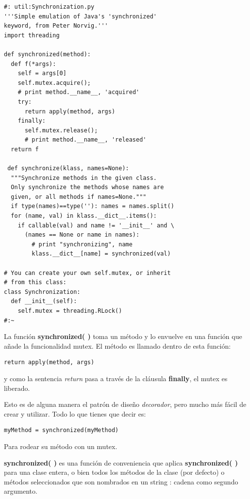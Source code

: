 \documentclass{article}
\begin{document}
\begin{lstlisting}    
#: util:Synchronization.py 
'''Simple emulation of Java's 'synchronized' 
keyword, from Peter Norvig.''' 
import threading 

def synchronized(method): 
  def f(*args): 
    self = args[0] 
    self.mutex.acquire();   
    # print method.__name__, 'acquired' 
    try: 
      return apply(method, args) 
    finally: 
      self.mutex.release();   
      # print method.__name__, 'released' 
  return f 
  
 def synchronize(klass, names=None): 
  """Synchronize methods in the given class.   
  Only synchronize the methods whose names are  
  given, or all methods if names=None.""" 
  if type(names)==type(''): names = names.split() 
  for (name, val) in klass.__dict__.items(): 
    if callable(val) and name != '__init__' and \ 
      (names == None or name in names): 
        # print "synchronizing", name 
        klass.__dict__[name] = synchronized(val) 
        
# You can create your own self.mutex, or inherit 
# from this class: 
class Synchronization: 
  def __init__(self): 
    self.mutex = threading.RLock() 
#:~  
\end{lstlisting}

La función \textbf{synchronized( )} toma un método y lo envuelve en una función que añade la funcionalidad mutex. El método es llamado dentro de esta función:     \newline

\begin{lstlisting} 
return apply(method, args)
\end{lstlisting}

y como la sentencia \textit{return } pasa a través de la cláusula \textbf{finally}, el mutex es liberado. \newline

Esto es de alguna manera el patrón de diseño \textit{decorador}, pero mucho más fácil de crear y utilizar. Todo lo que tienes que decir es:  \newline

\begin{lstlisting} 
myMethod = synchronized(myMethod)
\end{lstlisting}

Para rodear su método con un mutex. \newline

\textbf{synchronized( )} es una función de conveniencia que aplica \textbf{synchronized( )} para una clase entera, o bien todos los métodos de la clase (por defecto) o métodos seleccionados que son nombrados en un string : cadena como segundo argumento. \newline
\end{document}
